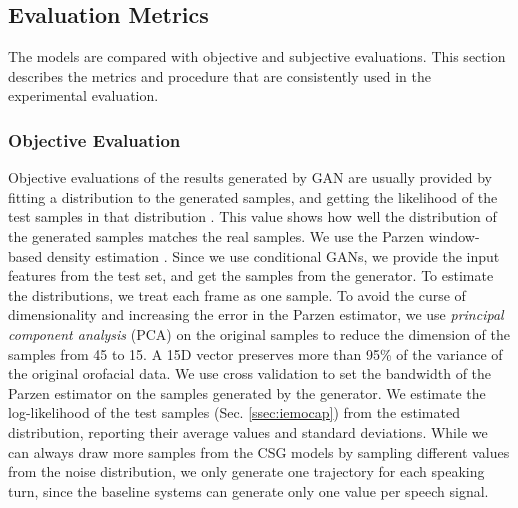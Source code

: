 \documentclass[10pt,journal,compsoc]{IEEEtran}
\begin{document}
\subsection{Evaluation Metrics}
\label{ssec:Metrics}

The models are compared with objective and subjective evaluations. This section describes the metrics and procedure that are consistently used in the experimental evaluation.

\subsubsection{Objective Evaluation}
\label{ssec:objeval}
Objective evaluations of the results generated by GAN are usually provided by fitting a distribution to the generated samples, and getting the likelihood of the test samples in that distribution \cite{Goodfellow_2014}. This value shows how well the distribution of the generated samples matches the real samples. We use the Parzen window-based density estimation \cite{Goodfellow_2014}. Since we use conditional GANs, we provide the input features from the test set, and get the samples from the generator. To estimate the distributions, we treat each frame as one sample. To avoid the curse of dimensionality and increasing the error in the Parzen estimator, we use \emph{principal component analysis} (PCA) on the original samples to reduce the dimension of the samples from 45 to 15. A 15D vector preserves more than 95\% of the variance of the original orofacial data. We use cross validation to set the bandwidth of the Parzen estimator on the samples generated by the generator. We estimate the log-likelihood of the test samples (Sec. \ref{ssec:iemocap}) from the estimated distribution, reporting their average values and standard deviations. While we can always draw more samples from the CSG models by sampling different values from the noise distribution, we only generate one trajectory for each speaking turn, since the baseline systems can generate only one value per speech signal.
\end{document}
